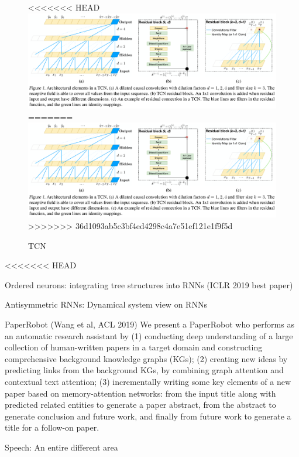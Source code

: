 \documentclass[english]{article}
\begin{document}
\begin{figure}
  \centering
<<<<<<< HEAD
  \includegraphics[scale=0.4]{tcn.png}
=======
  \includegraphics[scale=0.5]{tcn.png}
>>>>>>> 36d1093ab5c3bf4ed4298c4a7e51ef121e1f9f5d
    \caption{TCN}
    \label{TCN}
\end{figure}



<<<<<<< HEAD
\item Ordered neurons: integrating tree structures into RNNs (ICLR 2019 best paper)

\item Antisymmetric RNNs: Dynamical system view on RNNs

\item PaperRobot (Wang et al, ACL 2019) We present a PaperRobot who performs as an automatic research assistant by (1) conducting deep understanding of a large collection of human-written papers in a target domain and constructing comprehensive background knowledge graphs (KGs); (2) creating new ideas by predicting links from the background KGs, by combining graph attention and contextual text attention; (3) incrementally writing some key elements of a new paper based on memory-attention networks: from the input title along with predicted related entities to generate a paper abstract, from the abstract to generate conclusion and future work, and finally from future work to generate a title for a follow-on paper. 

\item Speech: An entire different area
\end{document}
